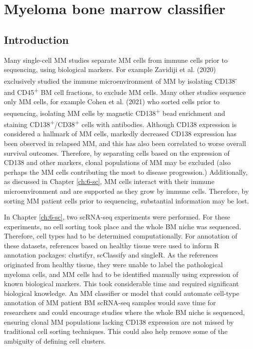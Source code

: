 \section{Myeloma bone marrow classifier}\label{sec:MM_classifier}
\subsection{Introduction}

Many single-cell MM studies separate MM cells from immune cells prior to sequencing, using biological markers.
For example Zavidiji et al. (2020) exclusively studied the immune microenvironment of MM by isolating CD138\textsuperscript{-} and CD45\textsuperscript{+} BM cell fractions, to exclude MM cells\cite{zavidij2020single}.
Many other studies sequence only MM cells, for example Cohen et al. (2021) who sorted cells prior to sequencing, isolating MM cells by magnetic CD138\textsuperscript{+} bead enrichment and staining CD138\textsuperscript{+}/CD38\textsuperscript{+} cells with antibodies\cite{cohen2021identification}.
Although CD138 expression is considered a hallmark of MM cells, markedly decreased CD138 expression has been observed in relapsed MM, and this has also been correlated to worse overall survival outcomes\cite{kawano2012multiple}.
Therefore, by separating cells based on the expression of CD138 and other markers, clonal populations of MM may be excluded (also perhaps the MM cells contributing the most to disease progression.)
Additionally, as discussed in Chapter \ref{ch:6-sc}, MM cells interact with their immune microenvironment and are supported as they grow by immune cells.
Therefore, by sorting MM patient cells prior to sequencing, substantial information may be lost.

In Chapter \ref{ch:6-sc}, two scRNA-seq experiments were performed.
For these experiments, no cell sorting took place and the whole BM niche was sequenced.
Therefore, cell types had to be determined computationally.
For annotation of these datasets, references based on healthy tissue were used to inform R annotation packages: clustifyr, scClassify and singleR.
As the references originated from healthy tissue, they were unable to label the pathological myeloma cells, and MM cells had to be identified manually using expression of known biological markers.
This took considerable time and required significant biological knowledge.
An MM classifier or model that could automate cell-type annotation of MM patient BM scRNA-seq samples would save time for researchers and could encourage studies where the whole BM niche is sequenced, ensuring clonal MM populations lacking CD138 expression are not missed by traditional cell sorting techniques.
This could also help remove some of the ambiguity of defining cell clusters.

